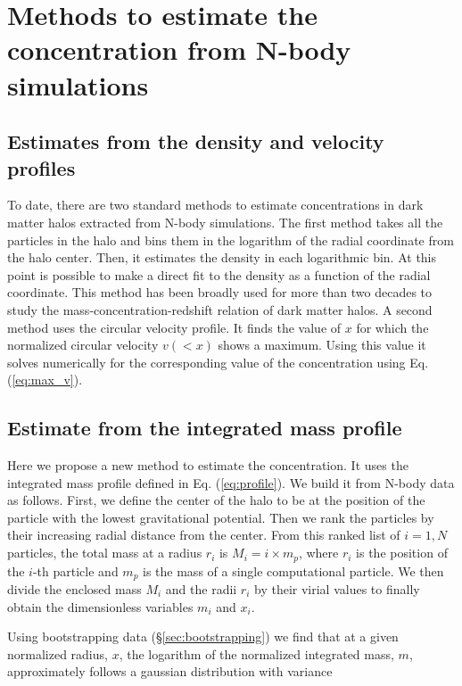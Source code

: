 \documentclass{emulateapj}
\begin{document}
\section{Methods to estimate the concentration from N-body simulations}
\label{sec:method}

\subsection{Estimates from the density and velocity profiles}

To date, there are two standard methods to estimate concentrations in
dark matter halos extracted from N-body simulations.  The first method
takes all the particles in the halo and bins them in the logarithm of
the radial coordinate from the halo center.  Then, it estimates the
density in each logarithmic bin.  At this point is possible to make a
direct fit to the density as a function of the radial coordinate.
This method has been broadly used for more than two decades to study
the mass-concentration-redshift relation of dark matter halos. 
A second method uses the circular velocity profile.  It finds the
value of $x$ for which the normalized circular velocity $v(<x)$ shows
a maximum.  Using this value it solves numerically for the
corresponding value of the concentration using Eq. (\ref{eq:max_v}). 


\subsection{Estimate from the integrated mass profile}

Here we propose a new method to estimate the concentration. 
It uses the integrated mass profile defined in
Eq. (\ref{eq:profile}).  We build it from N-body data as follows.
First, we define the center of the halo to be at the position of the
particle with the lowest gravitational potential. Then we rank the
particles by their increasing radial distance from the center.  From
this ranked list of $i=1,N$ particles, the total mass at a radius
$r_i$ is $M_i=i\times m_p$, where $r_i$ is the position of the $i$-th
particle and $m_p$ is the mass of a single computational particle. 
We then divide the enclosed mass $M_i$ and the radii $r_i$ by their
virial values to finally obtain the dimensionless variables $m_i$ and
$x_i$. 


Using bootstrapping data (\S \ref{sec:bootstrapping}) we find that at
a given normalized radius, $x$, the logarithm of the normalized
integrated mass, $m$, approximately follows a gaussian distribution
with variance
\end{document}
